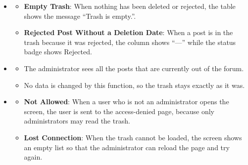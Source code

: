 \begin{itemize}[leftmargin=1.6em,topsep=4pt,itemsep=3pt,parsep=0pt,label=$\bullet$]
\begin{itemize}[leftmargin=2.2em,topsep=2pt,itemsep=3pt,parsep=0pt,label=$\circ$]
\begin{itemize}[leftmargin=2.2em,topsep=2pt,itemsep=3pt,parsep=0pt,label=$\blacksquare$]
                \end{itemize}
            \item \textbf{Switch to Comments}: The user presses the \textbf{Comments} tab at the top right of the screen to see the deleted comments instead (see \textbf{View Deleted Comments List}).
            \item \textbf{Move Between Pages}: When there is more than one page, the user uses the page numbers or the \textbf{Previous} and \textbf{Next} buttons at the bottom of the list.
            \item \textbf{Choose a Post}: The user opens a post with the view button, or restores it with the restore button in the row (see \textbf{View Deleted Post Details} and \textbf{Restore Deleted Post}).
        \end{itemize}
    \item {}
        \begin{itemize}[leftmargin=2.2em,topsep=2pt,itemsep=3pt,parsep=0pt,label=$\circ$]
            \item \textbf{Empty Trash}: When nothing has been deleted or rejected, the table shows the message ``Trash is empty.''.
            \item \textbf{Rejected Post Without a Deletion Date}: When a post is in the trash because it was rejected, the column shows ``---'' while the status badge shows Rejected.
        \end{itemize}
    \item {}
        \begin{itemize}[leftmargin=2.2em,topsep=2pt,itemsep=3pt,parsep=0pt,label=$\circ$]
            \item The administrator sees all the posts that are currently out of the forum.
            \item No data is changed by this function, so the trash stays exactly as it was.
        \end{itemize}
    \item {}
        \begin{itemize}[leftmargin=2.2em,topsep=2pt,itemsep=3pt,parsep=0pt,label=$\circ$]
            \item \textbf{Not Allowed}: When a user who is not an administrator opens the screen, the user is sent to the access-denied page, because only administrators may read the trash.
            \item \textbf{Lost Connection}: When the trash cannot be loaded, the screen shows an empty list so that the administrator can reload the page and try again.

\end{itemize}
\end{itemize}
